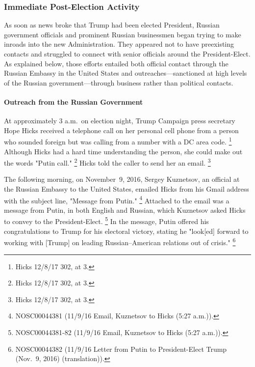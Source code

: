 \subsubsection{Immediate Post-Election Activity}

As soon as news broke that Trump had been elected President, Russian government officials and prominent Russian businessmen began trying to make inroads into the new Administration.
They appeared not to have preexisting contacts and struggled to connect with senior officials around the President-Elect.
As explained below, those efforts entailed both official contact through the Russian Embassy in the United States and outreaches---sanctioned at high levels of the Russian government---through business rather than political contacts.

\paragraph{Outreach from the Russian Government}

At approximately 3 a.m.\ on election night, Trump Campaign press secretary Hope Hicks received a telephone call on her personal cell phone from a person who sounded foreign but was calling from a number with a DC area code.%
\footnote{Hicks 12/8/17 302, at 3.}
Although Hicks had a hard time understanding the person, she could make out the words "Putin call."%
\footnote{Hicks 12/8/17 302, at 3.}
Hicks told the caller to send her an email.%
\footnote{Hicks 12/8/17 302, at 3.}

The following morning, on November~9, 2016, Sergey Kuznetsov, an official at the Russian Embassy to the United States, emailed Hicks from his Gmail address with the subject line, "Message from Putin."%
\footnote{NOSC00044381 (11/9/16 Email, Kuznetsov to Hicks (5:27 a.m.)).}
Attached to the email was a message from Putin, in both English and Russian, which Kuznetsov asked Hicks to convey to the President-Elect.%
\footnote{NOSC00044381-82 (11/9/16 Email, Kuznetsov to Hicks (5:27 a.m.)).}
In the message, Putin offered his congratulations to Trump for his electoral victory, stating he "look[ed] forward to working with [Trump] on leading Russian--American relations out of crisis."%
\footnote{NOSC00044382 (11/9/16 Letter from Putin to President-Elect Trump (Nov.~9, 2016) (translation)).}

